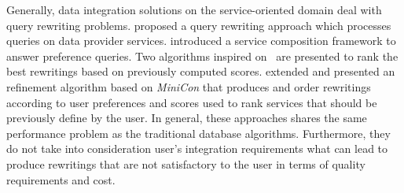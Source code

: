 %
%

%

Generally, data integration solutions on the service-oriented domain deal with query rewriting problems. \cite{Barhamgi2010} proposed a query rewriting approach which processes queries on data provider services.
%
\cite{Benouaret2011} introduced a service composition framework to answer preference queries. Two algorithms inspired
on~\cite{Barhamgi2010} are presented to rank the best rewritings based on previously computed scores.
%
\cite{ba2014} extended \cite{Umberto} and presented an refinement algorithm based on \textit{MiniCon} that produces and order rewritings according to user preferences and scores used to rank services that should be previously define by the user. 
In general, these approaches shares the same performance problem as the traditional database algorithms. Furthermore, they do not take into consideration user's integration requirements what can lead to produce rewritings that are not satisfactory to the user in terms of quality requirements and cost.

%

